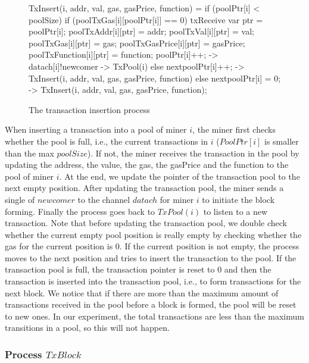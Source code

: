 \documentclass{KERauth}
\begin{document}
\begin{figure}[h]
\begin{center}
\begin{boxedverbatim}
TxInsert(i, addr, val, gas, gasPrice, function) =
  if (poolPtr[i] < poolSize) {
    if (poolTxGas[i][poolPtr[i]] == 0) {
      txReceive{
        var ptr = poolPtr[i];
        poolTxAddr[i][ptr] = addr;
        poolTxVal[i][ptr] = val;
        poolTxGas[i][ptr] = gas;
        poolTxGasPrice[i][ptr] = gasPrice;
        poolTxFunction[i][ptr] = function;
        poolPtr[i]++;} ->
      datach[i]!newcomer ->
      TxPool(i) }
    else {
      next{poolPtr[i]++;} ->
      TxInsert(i, addr, val, gas, gasPrice, function) } }
  else {
    next{poolPtr[i] = 0;} ->
    TxInsert(i, addr, val, gas, gasPrice, function)};
\end{boxedverbatim}
\end{center}
\caption{The transaction insertion process}\label{fig:txinsert}
\end{figure}
When inserting a transaction into a pool of miner $i$, the miner first checks whether the pool is full, i.e., the current transactions in $i$ ($PoolPtr[i]$ is smaller than the max $poolSize$). If not, the miner receives the transaction in the pool by updating the address, the value, the gas, the gasPrice and the function to the pool of miner $i$. At the end, we update the pointer of the transaction pool to the next empty position. After
updating the transaction pool, the miner sends a single of $newcomer$ to the channel $datach$ for miner $i$ to initiate the block forming. Finally the process goes back to $TxPool(i)$ to listen to a new transaction. Note that before updating the transaction pool, we double check whether the current empty pool position is really empty by checking whether the gas for the current position is $0$. If the current position is not empty, the process moves to the next position and tries to insert the transaction to the pool. If the transaction pool is full, the transaction pointer is reset to $0$ and then the transaction is inserted into the transaction pool, i.e., to form transactions for the next block. We notice that if there are more than the maximum amount of transactions received in the pool before a block is formed, the pool will be reset to new ones. In our experiment, the total transactions are less than the maximum transitions in a pool, so this will not happen.

\subsubsection{Process $TxBlock$}
\end{document}
